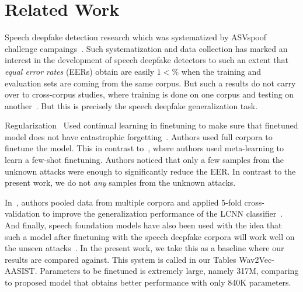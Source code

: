 \section{Related Work}
Speech deepfake detection research which was systematized by ASVspoof challenge campaings~\cite{Todisco2019ASVspoof2F, ASVspoof2021, Wang2024ASVspoof5C}. Such systematization and data collection has marked an interest in the development of speech deepfake detectors to such an extent that {\em equal error rates} (EERs) obtain are easily $1<\%$ when the training and evaluation sets are coming from the same corpus. But such a results do not carry over to cross-corpus studies, where training is done on one corpus and testing on another~\cite{müller2024doesaudiodeepfakedetection}. But this is precisely the speech deepfake generalization task. 

Regularization~\cite{Chen2020}
Used continual learning in finetuning to make sure that finetuned model does not have catastrophic forgetting~\cite{Ma2021}. Authors used full corpora to finetune the model. This in contrast to~\cite{kukanov2024metalearningapproachesimprovingdetection}, where authors used meta-learning to learn a few-shot finetuning. Authors noticed that only a few samples from the unknown attacks were enough to significantly reduce the EER. In contrast to the present work, we do not {\em any} samples from the unknown attacks. 

In~\cite{Kawa2022}, authors pooled data from multiple corpora and applied 5-fold cross-validation to improve the generalization performance of the LCNN classifier~\cite{lavrentyeva2019stcantispoofingsystemsasvspoof2019}. And finally, speech foundation models have also been used with the idea that such a model after finetuning with the speech deepfake corpora will work well on the unseen attacks~\cite{oneata2023generalisable, Wang2023}. In the present work, we take this as a baseline where our results are compared against. This system is called in our Tables Wav2Vec-AASIST. Parameters to be finetuned is extremely large, namely 317M, comparing to proposed model that obtains better performance with only 840K parameters.